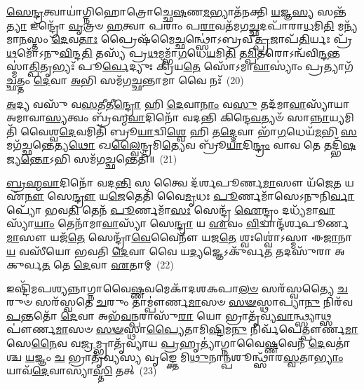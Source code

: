 \-\ul{𑌸𑍇}\-\-\ul{𑌨𑍍𑌦𑍍𑌰}\-𑌤𑍍𑌵𑌾𑌯𑌾॑𑌗𑍍𑌨𑌿𑌹𑍋𑌤𑍍𑌰𑍋𑌚𑍍𑌛𑍇\-\ul{𑌷}\-𑌣\-\ul{𑌮}\-𑌭𑍍𑌯𑌾𑌤᳴𑌨𑌕𑍍𑌤𑌿 \ul{𑌯}\-𑌜𑍍𑌞\-\ul{𑌸𑍍𑌯} 𑌸𑌨𑍍𑌤᳴\-\ul{𑌤𑍍𑌯𑌾} 𑌇𑌨𑍍𑌦𑍍𑌰𑍋᳴ \ul{𑌵𑍃}\-𑌤𑍍𑌰𑍞 \ul{𑌹}\-𑌤𑍍𑌵𑌾 𑌪𑌰𑌾𑌂॑ 𑌪\-\ul{𑌰𑌾}\-𑌵𑌤᳴𑌮𑌗\-\ul{𑌚𑍍𑌛}\-𑌦𑌪𑌾᳴𑌰𑌾\-\ul{𑌧}\-𑌮𑌿\-\ul{𑌤𑌿} 𑌮𑌨𑍍𑌯᳴𑌮𑌾\-\ul{𑌨}\-𑌸𑍍𑌤𑌂 \ul{𑌦𑍇}\-𑌵\-\ul{𑌤𑌾𑌃} 𑌪𑍍𑌰𑍈𑌷᳴𑌮𑍈\-\ul{𑌚𑍍𑌛}\-𑌨𑍍𑌥𑍍𑌸𑍋॑\-𑌽𑌬𑍍𑌰𑌵𑍀\-\ul{𑌤𑍍𑌪𑍍𑌰}\-𑌜𑌾𑌪᳴\-\ul{𑌤𑌿}\-𑌰𑍍𑌯𑌃 𑌪𑍍𑌰᳴\-\ul{𑌥}\-𑌮𑍋᳴\-𑌽𑌨𑍁\-\ul{𑌵𑌿}\-𑌨𑍍𑌦\-\ul{𑌤𑌿} 𑌤𑌸𑍍𑌯᳴ 𑌪𑍍𑌰\-\ul{𑌥}\-𑌮𑌮𑍍𑌭𑌾᳴\-\ul{𑌗}\-𑌧𑍇\-\ul{𑌯}\-𑌮𑌿\-\ul{𑌤𑌿} 𑌤\-\ul{𑌮𑍍𑌪𑌿}\-𑌤𑌰𑍋\-𑌽𑌨𑍍𑌵᳴𑌵𑌿\-\ul{𑌨𑍍𑌦}\-𑌨𑍍𑌤𑌸𑍍𑌮𑌾॑\-\ul{𑌤𑍍𑌪𑌿}\-𑌤𑍃𑌭𑍍𑌯𑌃᳴ 𑌪𑍂\-\ul{𑌰𑍍𑌵𑍇}\-𑌦𑍍𑌯𑍁𑌃 𑌕𑍍𑌰𑌿᳴𑌯\-\ul{𑌤𑍇} 𑌸𑍋᳴\-𑌽𑌮𑌾\-\ul{𑌵𑌾}\-𑌸𑍍𑌯𑌾𑌂॑ 𑌪𑍍𑌰𑌤𑍍𑌯𑌾𑌗᳴\-\ul{𑌚𑍍𑌛}\-𑌤𑍍𑌤𑌂 \ul{𑌦𑍇}\-𑌵𑌾 \ul{𑌅}\-𑌭𑌿 𑌸𑌮᳴𑌗\-\ul{𑌚𑍍𑌛}\-𑌨𑍍𑌤𑌾𑌮𑌾 𑌵𑍈 𑌨𑌃᳴~(20)

\-\ul{𑌅}\-𑌦𑍍𑌯 𑌵𑌸𑍁᳴ 𑌵\-\ul{𑌸}\-𑌤𑍀𑌤𑍀\-\ul{𑌨𑍍𑌦𑍍𑌰𑍋} 𑌹𑌿 \ul{𑌦𑍇}\-𑌵𑌾\-\ul{𑌨𑌾𑌂} 𑌵\-\ul{𑌸𑍁} 𑌤𑌦᳴𑌮𑌾\-\ul{𑌵𑌾}\-𑌸𑍍𑌯𑌾᳴𑌯𑌾 𑌅𑌮𑌾𑌵𑌾\-\ul{𑌸𑍍𑌯}\-𑌤𑍍𑌵𑌂 𑌬𑍍𑌰᳴𑌹𑍍𑌮\-\ul{𑌵𑌾}\-𑌦𑌿𑌨𑍋᳴ 𑌵𑌦𑌨𑍍𑌤𑌿 𑌕𑌿𑌨𑍍𑌦𑍇\-\ul{𑌵}\-𑌤𑍍𑌯𑍞᳴ 𑌸𑌾\-\ul{𑌨𑍍𑌨𑌾}\-𑌯𑍍𑌯𑌮𑌿𑌤𑌿᳴ 𑌵𑍈𑌶𑍍𑌵\-\ul{𑌦𑍇}\-𑌵𑌮𑌿𑌤𑌿᳴ 𑌬𑍍𑌰𑍂\-\ul{𑌯𑌾}\-𑌦𑍍𑌵𑌿\-\ul{𑌶𑍍𑌵𑍇} 𑌹𑌿 𑌤\-\ul{𑌦𑍍𑌦𑍇}\-𑌵𑌾 𑌭𑌾᳴\-\ul{𑌗}\-𑌧𑍇𑌯᳴\-\ul{𑌮}\-𑌭𑌿 \ul{𑌸}\-𑌮𑌗᳴\-\ul{𑌚𑍍𑌛}\-𑌨𑍍𑌤𑍇𑌤𑍍𑌯\-\ul{𑌥𑍋} 𑌖\-\ul{𑌲𑍍𑌵𑍈}\-𑌨𑍍𑌦𑍍𑌰𑌮𑌿\-\ul{𑌤𑍍𑌯𑍇}\-𑌵 𑌬𑍍𑌰𑍂᳴\-\ul{𑌯𑌾}\-𑌦𑌿\-\ul{𑌨𑍍𑌦𑍍𑌰𑌂} 𑌵𑌾𑌵 𑌤𑍇 𑌤𑌦𑍍𑌭𑌿᳴\-\ul{𑌷}\-𑌜𑍍𑌯\-\ul{𑌨𑍍𑌤𑍋}\-\-𑌽𑌭𑌿 𑌸𑌮᳴𑌗\-\ul{𑌚𑍍𑌛}\-𑌨𑍍𑌤𑍇𑌤𑌿᳴॥~(21)

{}%

\-\ul{𑌬𑍍𑌰}\-\-\ul{𑌹𑍍𑌮}\-\-\ul{𑌵𑌾}\-𑌦𑌿𑌨𑍋᳴ 𑌵𑌦\-\ul{𑌨𑍍𑌤𑌿} 𑌸 𑌤𑍍𑌵𑍈 𑌦᳴𑌰𑍍𑌶𑌪𑍂𑌰𑍍𑌣\-\ul{𑌮𑌾}\-𑌸𑍗 𑌯᳴𑌜𑍇\-\ul{𑌤} 𑌯 𑌏᳴\-\ul{𑌨𑍗} 𑌸𑍇\-\ul{𑌨𑍍𑌦𑍍𑌰𑍗} 𑌯\-\ul{𑌜𑍇}\-𑌤𑍇𑌤𑌿᳴ 𑌵𑍈\-\ul{𑌮𑍃}\-𑌧𑌃 \ul{𑌪𑍂}\-𑌰𑍍𑌣𑌮𑌾᳴𑌸𑍇\-𑌽𑌨𑍁𑌨𑌿\-\ul{𑌰𑍍𑌵𑌾}\-𑌪𑍍𑌯𑍋᳴ 𑌭𑌵\-\ul{𑌤𑌿} 𑌤𑍇𑌨᳴ \ul{𑌪𑍂}\-𑌰𑍍𑌣𑌮𑌾᳴\-\ul{𑌸𑌃} 𑌸𑍇𑌨𑍍𑌦𑍍𑌰᳴ \ul{𑌐}\-𑌨𑍍𑌦𑍍𑌰𑌂 𑌦𑌧𑍍𑌯᳴𑌮𑌾\-\ul{𑌵𑌾}\-𑌸𑍍𑌯𑌾᳴\-\ul{𑌯𑌾𑌂} 𑌤𑍇𑌨𑌾᳴𑌮𑌾\-\ul{𑌵𑌾}\-𑌸𑍍𑌯𑌾᳴ 𑌸𑍇\-\ul{𑌨𑍍𑌦𑍍𑌰𑌾} 𑌯 \ul{𑌏}\-𑌵𑌂 \ul{𑌵𑌿}\-𑌦𑍍𑌵𑌾𑌨𑍍𑌦᳴𑌰𑍍𑌶𑌪𑍂𑌰𑍍𑌣\-\ul{𑌮𑌾}\-𑌸𑍗 𑌯𑌜᳴\-\ul{𑌤𑍇} 𑌸𑍇𑌨𑍍𑌦𑍍𑌰𑌾᳴\-\ul{𑌵𑍇}\-𑌵𑍈𑌨𑍗᳴ 𑌯𑌜\-\ul{𑌤𑍇} 𑌶𑍍𑌵𑌃𑌶𑍍𑌵𑍋॑\-𑌽𑌸𑍍𑌮𑌾 𑌈\-\ul{𑌜𑌾}\-𑌨𑌾\-\ul{𑌯} 𑌵𑌸𑍀᳴𑌯𑍋 𑌭𑌵𑌤𑌿 \ul{𑌦𑍇}\-𑌵𑌾 𑌵𑍈 𑌯\-\ul{𑌦𑍍𑌯}\-𑌜𑍍𑌞𑍇\-𑌽𑌕𑍁᳴𑌰𑍍𑌵\-\ul{𑌤} 𑌤𑌦𑌸𑍁᳴𑌰𑌾 𑌅𑌕𑍁𑌰𑍍𑌵\-\ul{𑌤} 𑌤𑍇 \ul{𑌦𑍇}\-𑌵𑌾 \ul{𑌏}\-𑌤𑌾𑌮𑍍~(22)

𑌇𑌷𑍍𑌟𑌿᳴𑌮𑌪𑌶𑍍𑌯𑌨𑍍𑌨𑌾𑌗𑍍𑌨𑌾𑌵𑍈\-\ul{𑌷𑍍𑌣}\-𑌵𑌮𑍇𑌕𑌾᳴\-𑌦𑌶\-𑌕𑌪𑌾\-\ul{𑌲}\-\-\ul{𑍞} 𑌸𑌰᳴𑌸𑍍𑌵𑌤𑍍𑌯𑍈 \ul{𑌚}\-𑌰𑍁𑍞 𑌸𑌰᳴𑌸𑍍𑌵𑌤𑍇 \ul{𑌚}\-𑌰𑍁𑌂 𑌤𑌾𑌮𑍍𑌪𑍗॑𑌰𑍍𑌣\-\ul{𑌮𑌾}\-𑌸𑍞 \ul{𑌸}\-\-\ul{𑍟}\-𑌸𑍍𑌥𑌾𑌪𑍍𑌯𑌾\-\ul{𑌨𑍁} 𑌨𑌿𑌰᳴𑌵\-\ul{𑌪}\-𑌨𑍍𑌤𑌤𑍋᳴ \ul{𑌦𑍇}\-𑌵𑌾 𑌅𑌭᳴\-\ul{𑌵}\-𑌨𑍍𑌪𑌰𑌾𑌸𑍁᳴\-\ul{𑌰𑌾} 𑌯𑍋 𑌭𑍍𑌰𑌾𑌤𑍃᳴𑌵𑍍𑌯\-\ul{𑌵𑌾}\-𑌨𑍍𑌥𑍍𑌸𑍍𑌯𑌾𑌥𑍍𑌸 𑌪𑍗॑𑌰𑍍𑌣\-\ul{𑌮𑌾}\-𑌸𑍞 \ul{𑌸}\-\-\ul{𑍟}\-𑌸𑍍𑌥𑌾\-\ul{𑌪𑍍𑌯𑍈}\-𑌤𑌾𑌮𑌿\-\ul{𑌷𑍍𑌟𑌿}\-𑌮\-\ul{𑌨𑍁} 𑌨𑌿𑌰𑍍𑌵᳴𑌪𑍇𑌤𑍍𑌪𑍗𑌰𑍍𑌣\-\ul{𑌮𑌾}\-𑌸𑍇\-\ul{𑌨𑍈}\-𑌵 𑌵\-\ul{𑌜𑍍𑌰}\-𑌮𑍍𑌭𑍍𑌰𑌾𑌤𑍃᳴𑌵𑍍𑌯𑌾𑌯 \ul{𑌪𑍍𑌰}\-𑌹𑍃𑌤𑍍𑌯𑌾॑𑌗𑍍𑌨𑌾𑌵𑍈\-\ul{𑌷𑍍𑌣}\-𑌵𑍇𑌨᳴ \ul{𑌦𑍇}\-𑌵𑌤𑌾॑𑌶𑍍𑌚 \ul{𑌯}\-𑌜𑍍𑌞𑌂 \ul{𑌚} 𑌭𑍍𑌰𑌾𑌤𑍃᳴𑌵𑍍𑌯𑌸𑍍𑌯 𑌵𑍃𑌙𑍍𑌕𑍍𑌤𑍇 𑌮𑌿\-\ul{𑌥𑍁}\-𑌨𑌾\-\ul{𑌨𑍍𑌪}\-𑌶𑍂𑌨𑍍𑌥𑍍𑌸𑌾᳴𑌰\-\ul{𑌸𑍍𑌵}\-𑌤𑌾\-\ul{𑌭𑍍𑌯𑌾𑌂} 𑌯𑌾𑌵᳴\-\ul{𑌦𑍇}\-𑌵𑌾𑌸𑍍𑌯𑌾\-\ul{𑌸𑍍𑌤𑌿} 𑌤𑌤𑍍~(23)

